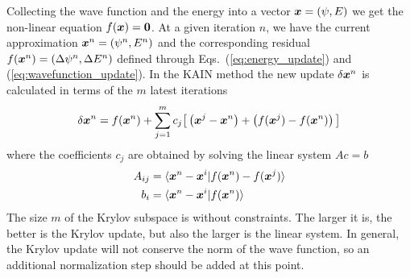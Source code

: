 Collecting the wave function and the energy into a vector $\boldsymbol x = (\psi,E)$ we 
get the non-linear equation $f(\boldsymbol x) = \boldsymbol 0$. At a given iteration $n$, we have the 
current approximation $\boldsymbol x^n = (\psi^n,E^n)$ and the corresponding residual 
$f(\boldsymbol x^n) = (\Delta \psi^n,\Delta E^n)$ defined through 
Eqs.~(\ref{eq:energy_update}) and (\ref{eq:wavefunction_update}). In the KAIN method the
new update $\delta\boldsymbol x^n$ is calculated in terms of the $m$ latest iterations
\begin{equation}
    \label{eq:KAIN_update}
    \delta \boldsymbol x^n = f(\boldsymbol x^n) + \sum_{j=1}^m c_j 
	\big[\left(\boldsymbol x^{j}-\boldsymbol x^{n}\right) + \left(f(\boldsymbol x^j)-f(\boldsymbol x^{n})\right)\big] 
\end{equation}
where the coefficients $c_j$ are obtained by solving the linear system $Ac=b$ 
\begin{align}
    A_{ij} &= \langle\boldsymbol x^n - \boldsymbol x^i|
		f(\boldsymbol x^n) - f(\boldsymbol x^j)\rangle\\
    b_{i}   &= \langle\boldsymbol x^n - \boldsymbol x^i | f(\boldsymbol x^n)\rangle
\end{align}
The size $m$ of the Krylov subspace is without constraints. The larger it is, 
the better is the Krylov update, but also the larger is the linear system. In 
general, the Krylov update will not conserve the norm of the wave function, so an 
additional normalization step should be added at this point.

